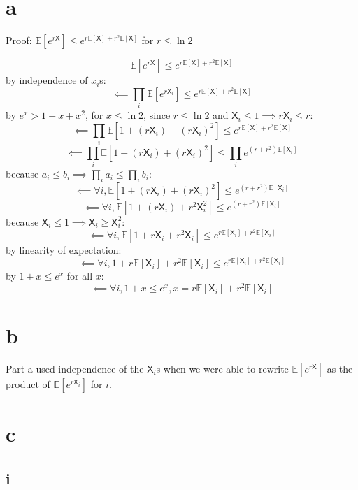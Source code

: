 \documentclass{article}
\newcommand{\E}{\mathbb{E}}
\newcommand{\rX}{\mathsf{X}}
\begin{document}
\section*{a}

Proof: $\E[e^{r\rX}] \leq e^{r\E[\rX] + r^2 \E[\rX]}$ for $r \leq \ln2$




$$\E[e^{r\rX}] \leq e^{r\E[\rX] + r^2 \E[\rX]}$$
by independence of $x_i$s:
$$\impliedby \prod_i \E[e^{r\rX_i}] \leq e^{r\E[\rX] + r^2 \E[\rX]}$$
by $e^x > 1 + x + x^2$, for $x \leq \ln2$, since $r \leq \ln2$ and $\rX_i \leq 1
\implies r\rX_i \leq r$:
$$\impliedby \prod_i \E[1+(r\rX_i) + (r\rX_i)^2] \leq e^{r\E[\rX] + r^2 \E[\rX]}$$
$$\impliedby \prod_i \E[1+(r\rX_i) + (r\rX_i)^2] \leq \prod_i e^{(r+r^2)\E[\rX_i]}$$
because $a_i \leq b_i \implies \prod_i a_i \leq \prod_i b_i$:
$$\impliedby \forall i, \E[1 + (r\rX_i) + (r\rX_i)^2] \leq e^{(r+r^2)\E[\rX_i]}$$
$$\impliedby \forall i, \E[1 + (r\rX_i) + r^2\rX_i^2] \leq e^{(r+r^2)\E[\rX_i]}$$
because $\rX_i \leq 1 \implies \rX_i \geq \rX_i^2$:
$$\impliedby \forall i, \E[1 + r\rX_i + r^2\rX_i] \leq e^{r\E[\rX_i]+r^2\E[\rX_i]}$$
by linearity of expectation:
$$\impliedby \forall i, 1 + r\E[\rX_i] + r^2\E[\rX_i] \leq e^{r\E[\rX_i]+r^2\E[\rX_i]}$$
by $1 + x \leq e^x$ for all $x$:
$$\impliedby \forall i, 1 + x \leq e^x, x = r\E[\rX_i] + r^2\E[\rX_i]$$

\section*{b}

Part a used independence of the $\rX_i$s when we were able to rewrite
$\E[e^{r\rX}]$ as the product of $\E[e^{r\rX_i}]$ for $i$.

\pagebreak

\section*{c}

\subsection*{i}

\end{document}

